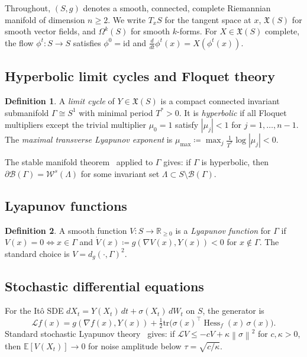 \documentclass[12pt, oneside]{book}
\theoremstyle{plain}
\theoremstyle{definition}
\newtheorem{definition}{Definition}[section]
\theoremstyle{remark}
\newcommand{\R}{\mathbb{R}}
\newcommand{\Orb}{\Gamma}
\newcommand{\cB}{\mathcal{B}}
\newcommand{\cL}{\mathcal{L}}
\newcommand{\dg}{d_g}
\newcommand{\norm}[1]{\left\|#1\right\|}
\newcommand{\abs}[1]{\left|#1\right|}
\DeclareMathOperator{\Hess}{Hess}
\begin{document}
Throughout, $(S,g)$ denotes a smooth, connected, complete Riemannian
manifold of dimension $n\ge 2$. We write $T_xS$ for the tangent space
at $x$, $\mathfrak{X}(S)$ for smooth vector fields, and $\Omega^k(S)$
for smooth $k$-forms. For $X\in\mathfrak{X}(S)$ complete, the flow
$\phi^t\colon S\to S$ satisfies $\phi^0=\mathrm{id}$ and
$\tfrac{d}{dt}\phi^t(x)=X(\phi^t(x))$.

\subsection{Hyperbolic limit cycles and Floquet theory}

\begin{definition}\label{def:limitcycle}
A \emph{limit cycle} of $Y\in\mathfrak{X}(S)$ is a compact connected
invariant submanifold $\Orb\cong S^1$ with minimal period $T^*>0$.
It is \emph{hyperbolic} if all Floquet multipliers except the trivial
multiplier $\mu_0=1$ satisfy $\abs{\mu_j}<1$ for $j=1,\ldots,n-1$.
The \emph{maximal transverse Lyapunov exponent} is
$\mu_{\max}\coloneqq\max_j\tfrac{1}{T^*}\log\abs{\mu_j}<0$.
\end{definition}

The stable manifold theorem~\cite{HPS} applied to $\Orb$ gives: if
$\Orb$ is hyperbolic, then $\partial\cB(\Orb)=\mathcal{W}^s(\Lambda)$
for some invariant set $\Lambda\subset S\setminus\cB(\Orb)$.

\subsection{Lyapunov functions}

\begin{definition}\label{def:lyapunov}
A smooth function $V\colon S\to\R_{\ge 0}$ is a \emph{Lyapunov function}
for $\Orb$ if $V(x)=0\iff x\in\Orb$ and
$\dot V(x)\coloneqq g(\nabla V(x),Y(x))<0$ for $x\notin\Orb$.
The standard choice is $V=\dg(\cdot,\Orb)^2$.
\end{definition}

\subsection{Stochastic differential equations}

For the It\^o SDE $dX_t=Y(X_t)\,dt+\sigma(X_t)\,dW_t$ on $S$,
the generator is
\[
  \cL f(x) = g(\nabla f(x),Y(x))
             + \tfrac12\mathrm{tr}\bigl(\sigma(x)^\top\Hess_f(x)\,\sigma(x)\bigr).
\]
Standard stochastic Lyapunov theory~\cite{Hasminski} gives: if
$\cL V\le -cV+\kappa\norm\sigma^2$ for $c,\kappa>0$, then
$\mathbb{E}[V(X_t)]\to 0$ for noise amplitude below $\tau=\sqrt{c/\kappa}$.
\end{document}
